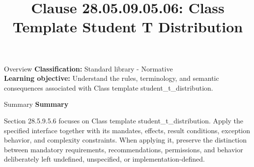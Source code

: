 \documentclass[10pt,letterpaper]{article}
\title{Clause 28.05.09.05.06: Class Template Student T Distribution}
\author{}
\date{}
\begin{document}
\maketitle
\begin{CornellOverviewBox}{Overview}
\textbf{Classification:} Standard library - Normative\\[2pt]
\textbf{Learning objective:} Understand the rules, terminology, and semantic consequences associated with Class template student\_t\_distribution.
\end{CornellOverviewBox}\begin{CornellSummaryBox}{Summary}
{\sffamily\bfseries\color{Accent} Summary}\par\vspace{3pt}Section 28.5.9.5.6 focuses on Class template student\_t\_distribution. Apply the specified interface together with its mandates, effects, result conditions, exception behavior, and complexity constraints. When applying it, preserve the distinction between mandatory requirements, recommendations, permissions, and behavior deliberately left undefined, unspecified, or implementation-defined.
\end{CornellSummaryBox}
\end{document}
